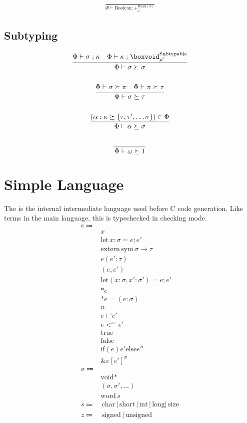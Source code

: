 \documentclass {article}
\begin{document}
\begin{gather*}
\frac
{}
{ \Phi \vdash \text{Boolean} : +^{\text{Word}(8)}_\omega}
\end{gather*}

\subsection{Subtyping}
\begin{gather*}
\frac
{\Phi \vdash \sigma : \kappa \quad \Phi \vdash \kappa : \boxvoid^\text{Subtypable}_{\mu'}}
{\Phi \vdash \sigma \succeq \sigma} \\
\\
\frac
{\Phi \vdash \sigma \succeq \pi \quad \Phi \vdash \pi \succeq \tau}
{\Phi \vdash \sigma \succeq \tau} \\
\\
\frac
{(\alpha : \kappa \succeq  \{ \tau, \tau', \dots \sigma \}) \in \Phi }
{\Phi \vdash \alpha \succeq \sigma} \\
\\
\frac
{}
{\Phi \vdash \omega \succeq 1}
\end{gather*}

\section{Simple Language}
The is the internal intermediate language used before C code generation.
Like terms in the main language, this is typechecked in checking mode.
\begin{align*}
e \Coloneqq & \\
& x \\
& \text{let} \, x : \sigma = e; e' \\
& \text{extern} \, \text{sym} \, \sigma \to \tau \\
& e(e' : \tau) \\
& (e,e') \\
& \text{let} (x: \sigma, x' : \sigma') = e; e' \\
& * e \\
& * e = (e : \sigma) \\
& n \\
& e +^z e' \\
& e <^{sz} e' \\
& \text{true} \\
& \text{false} \\
& \text{if} (e) {e'} \text{else} {e''} \\
& \&e[e']^\sigma \\
\sigma \Coloneqq & \\
& \text{void}* \\ 
& (\sigma, \sigma', \dots) \\
& \text{word} \, s \\
s \Coloneqq & \, \text{char} \, | \, \text{short} \, | \, \text{int} \, | \, \text{long} | \, \text{size} \\
z \Coloneqq & \, \text{signed} \, | \, \text{unsigned}
\end{align*}
\end{document}
